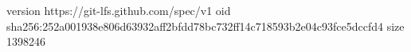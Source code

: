 version https://git-lfs.github.com/spec/v1
oid sha256:252a001938e806d63932aff2bfdd78bc732ff14c718593b2e04c93fce5dccfd4
size 1398246
